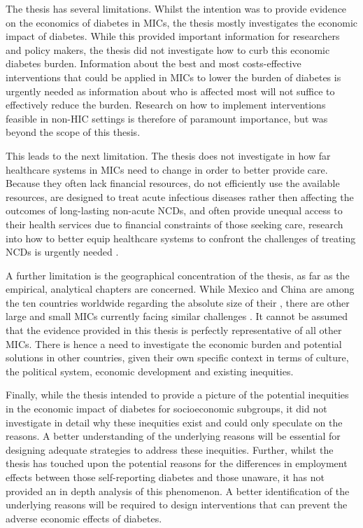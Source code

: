 The thesis has several limitations. Whilst the intention was to provide evidence on the economics of diabetes in \acp{MIC}, the thesis mostly investigates the economic impact of diabetes. While this provided important information for researchers and policy makers, the thesis did not investigate how to curb this economic diabetes burden. Information about the best and most costs-effective interventions that could be applied in \acp{MIC} to lower the burden of diabetes is urgently needed as information about who is affected most will not suffice to effectively reduce the burden. Research on how to implement interventions feasible in non-\ac{HIC} settings is therefore of paramount importance, but was beyond the scope of this thesis.

This leads to the next limitation. The thesis does not investigate in how far healthcare systems in \acp{MIC} need to change in order to better provide care. Because they often lack financial resources, do not efficiently use the available resources, are designed to treat acute infectious diseases rather then affecting the outcomes of long-lasting non-acute \acp{NCD}, and often provide unequal access to their health services due to financial constraints of those seeking care, research into how to better equip healthcare systems to confront the challenges of treating \acp{NCD} is urgently needed \parencite{Mills2014,Guzman2010}.

A further limitation is the geographical concentration of the thesis, as far as the empirical, analytical chapters are concerned. While Mexico and China are among the ten countries worldwide regarding the absolute size of their \DIFdelbegin {}\DIFdelend \DIFaddbegin {}\DIFaddend , there are other large and small \acp{MIC} currently facing similar challenges \parencite{Risk2016}.  It cannot be assumed that the evidence provided in this thesis is perfectly representative of all other \acp{MIC}. There is hence a need to investigate the economic burden and potential solutions in other countries, given their own specific context in terms of culture, the political system, economic development and existing inequities.

Finally, while the thesis intended to provide a picture of the potential inequities in the economic impact of diabetes for socioeconomic subgroups, it did not investigate in detail why these inequities exist and could only speculate on the reasons. A better understanding of the underlying reasons will be essential for designing adequate strategies to address these inequities. Further, whilst the thesis has touched upon the potential reasons for the differences in employment effects between those self-reporting diabetes and those unaware, it has not provided an in depth analysis of this phenomenon. A better identification of the underlying reasons will be required to design interventions that can prevent the adverse economic effects of diabetes. 




